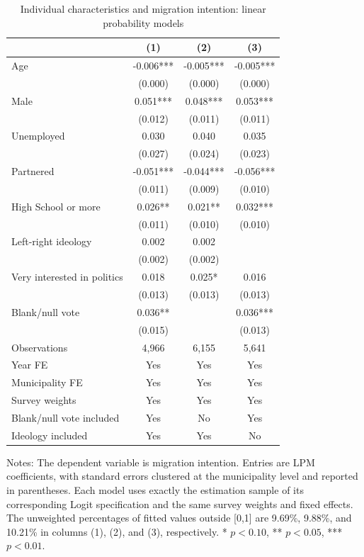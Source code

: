 \begin{table}[htbp]
\normalsize
\renewcommand{\arraystretch}{1.25}
\setlength{\tabcolsep}{6pt}
\centering
\caption{Individual characteristics and migration intention: linear probability models}
\label{tab:individual_characteristics_lpm_stata}
\setlength{\tabcolsep}{4pt}
\captionsetup{justification=centering}
\begin{tabular}{lccc}
\hline
 & (1) & (2) & (3) \\
\hline
Age & -0.006*** & -0.005*** & -0.005*** \\
 & (0.000) & (0.000) & (0.000) \\
Male & 0.051*** & 0.048*** & 0.053*** \\
 & (0.012) & (0.011) & (0.011) \\
Unemployed & 0.030 & 0.040 & 0.035 \\
 & (0.027) & (0.024) & (0.023) \\
Partnered & -0.051*** & -0.044*** & -0.056*** \\
 & (0.011) & (0.009) & (0.010) \\
High School or more & 0.026** & 0.021** & 0.032*** \\
 & (0.011) & (0.010) & (0.010) \\
Left-right ideology & 0.002 & 0.002 &  \\
 & (0.002) & (0.002) &  \\
Very interested in politics & 0.018 & 0.025* & 0.016 \\
 & (0.013) & (0.013) & (0.013) \\
Blank/null vote & 0.036** &  & 0.036*** \\
 & (0.015) &  & (0.013) \\
\hline
Observations &        4,966 &        6,155 &        5,641 \\
Year FE & Yes & Yes & Yes \\
Municipality FE & Yes & Yes & Yes \\
Survey weights & Yes & Yes & Yes \\
Blank/null vote included & Yes & No & Yes \\
Ideology included & Yes & Yes & No \\
\hline
\end{tabular}
\par\vspace{1.5mm}
\begin{minipage}{0.98\linewidth}
\footnotesize\setlength{\parindent}{0pt}\setlength{\parskip}{1pt}
Notes: The dependent variable is migration intention. Entries are LPM coefficients, with standard errors clustered at the municipality level and reported in parentheses. Each model uses exactly the estimation sample of its corresponding Logit specification and the same survey weights and fixed effects. The unweighted percentages of fitted values outside [0,1] are  9.69\%,  9.88\%, and 10.21\% in columns (1), (2), and (3), respectively. * \(p<0.10\), ** \(p<0.05\), *** \(p<0.01\).
\end{minipage}
\end{table}
